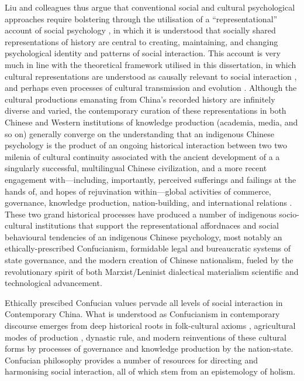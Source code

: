 {%
Liu and colleagues thus argue that conventional social and cultural psychological approaches require bolstering through the utilisation of a ``representational'' account of social psychology \citep{Liu2005}, in which it is understood that socially shared representations of history are central to creating, maintaining, and changing psychological identity and patterns of social interaction.  This account is very much in line with the theoretical framework utilised in this dissertation, in which cultural representations are understood as causally relevant to social interaction \citep{Vesper2017}, and perhaps even processes of cultural transmission and evolution \citep{Claidiere2014}.  Although the cultural productions emanating from China's recorded history are infinitely diverse and varied, the contemporary curation of these representations in both Chinese and Western institutions of knowledge production (academia, media, and so on) generally converge on the understanding that an indigenous Chinese psychology is the product of an ongoing historical interaction between two two milenia of cultural continuity associated with the ancient development of a a singularly successful, multilingual Chinese civilization, and a more recent engagement with---including, importantly, perceived sufferings and failings at the hands of, and hopes of rejuvination within---global activities of commerce, governance, knowledge production, nation-building, and international relations \citep{Liu2009,Barme2009}.  These two grand historical processes have produced a number of indigenous socio-cultural institutions that support the representational affordnaces and social behavioural tendencies of an indigenous Chinese psychology, most notably an ethically-prescribed Confucianism, formidable legal and bureaucratic systems of state governance, and the modern creation of Chinese nationalism, fueled by the revolutionary spirit of both Marxist/Leninist dialectical materialism scientific and technological advancement.

Ethically prescibed Confucian values pervade all levels of social interaction in Contemporary China. What is understood as Confucianism in contemporary discourse emerges from deep historical roots in folk-cultural axioms \citep{Wang2009}, agricultural modes of production \citep{Talhelm2014,Fei1992}, dynastic rule, and modern reinventions of these cultural forms by processes of governance and knowledge production by the nation-state\citep{Hwang1999,Liu2014}.  Confucian philosophy provides a number of resources for directing and harmonising social interaction, all of which stem from an epistemology of holism.


}
